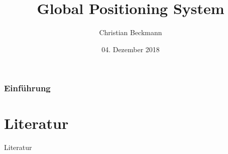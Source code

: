 
\title{Global Positioning System}
\author[C.~Beckmann]{Christian Beckmann}
\date{04. Dezember 2018}


    \maketitle
    \begin{frame}
        \frametitle{Einführung}
        \tableofcontents
    \end{frame}
    
    
    
    \section{Literatur}
    \begin{frame}{Literatur}
        \nocite{*}
        \printbibliography
    \end{frame}

